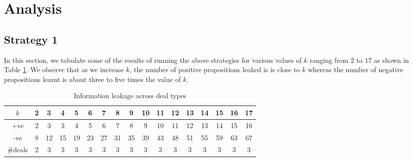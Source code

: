 \section{Analysis}

\subsection{Strategy 1}
In this section, we tabulate some of the results of running the above 
strategies for various values of $k$ ranging from $2$ to $17$
as shown in Table \ref{leakageDTypes}. We observe that as
we increase $k$, the number of positive propositions leaked is
is close to $k$ whereas the number of negative propositions learnt
is about three to five times the value of $k$.

\begin{table}[h]
\begin{tabular}{| c || c | c | c | c | c |c | c | c | c | c | c | c | c | c | c | c |}
\hline
    $k$  &   2 &  3  &  4 & 5&  6 & 7 & 8 & 9 & 10 & 11 & 12 & 13 & 14 & 15 & 16 & 17 \\

\hline
  +ve    &   2 &  3  &  3 &  4 &  5 &  6 &  7 &  8 &  9   & 10  & 11 & 12 & 13 & 14 & 15 & 16\\
  -ve    &   8 &  12 &  15 &  19 &  23 &  27 &  31 &  35  & 39 & 43 & 48  & 51 & 55 & 59 &63 &67\\
  \#deals &   2 &  3  &  3 &  3 &  3 &  3 &  3 &  3 &  3  & 3  & 3 & 3 & 3 & 3 & 3 & 3\\
\hline
\end{tabular}
\caption{Information leakage across deal types}
\label{leakageDTypes}
\end{table}

